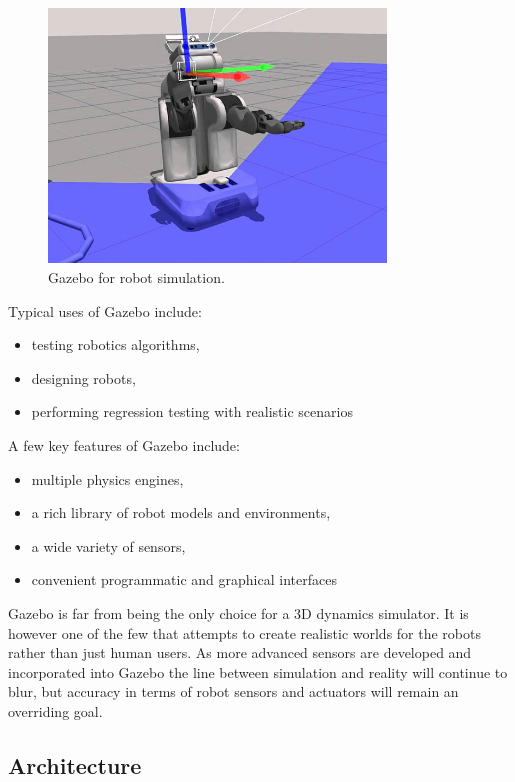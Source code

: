 \begin{figure}[h]
\centering
\includegraphics[width=0.8\textwidth]{figs/ch2/osrf.jpeg}
\caption{Gazebo for robot simulation.}
\label{fig:pr2}
\end{figure}

Typical uses of Gazebo include:

\begin{itemize}
\item testing robotics algorithms,
\item designing robots,
\item performing regression testing with realistic scenarios
\end{itemize}

A few key features of Gazebo include:

\begin{itemize}
\item multiple physics engines,
\item a rich library of robot models and environments,
\item a wide variety of sensors,
\item convenient programmatic and graphical interfaces
\end{itemize}

Gazebo is far from being the only choice for a 3D dynamics simulator. It is however one of the few that attempts to create realistic worlds for the robots rather than just human users. As more advanced sensors are developed and incorporated into Gazebo the line between simulation and reality will continue to blur, but accuracy in terms of robot sensors and actuators will remain an overriding goal.

\subsection{Architecture}

